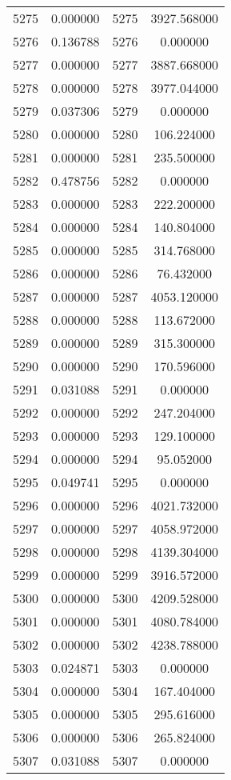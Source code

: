 \documentclass[12pt]{article}
\begin{document}
\begin{longtable}{@{}cccc@{}}
5275 & 0.000000 & 5275 & 3927.568000 \\
5276 & 0.136788 & 5276 & 0.000000 \\
5277 & 0.000000 & 5277 & 3887.668000 \\
5278 & 0.000000 & 5278 & 3977.044000 \\
5279 & 0.037306 & 5279 & 0.000000 \\
5280 & 0.000000 & 5280 & 106.224000 \\
5281 & 0.000000 & 5281 & 235.500000 \\
5282 & 0.478756 & 5282 & 0.000000 \\
5283 & 0.000000 & 5283 & 222.200000 \\
5284 & 0.000000 & 5284 & 140.804000 \\
5285 & 0.000000 & 5285 & 314.768000 \\
5286 & 0.000000 & 5286 & 76.432000 \\
5287 & 0.000000 & 5287 & 4053.120000 \\
5288 & 0.000000 & 5288 & 113.672000 \\
5289 & 0.000000 & 5289 & 315.300000 \\
5290 & 0.000000 & 5290 & 170.596000 \\
5291 & 0.031088 & 5291 & 0.000000 \\
5292 & 0.000000 & 5292 & 247.204000 \\
5293 & 0.000000 & 5293 & 129.100000 \\
5294 & 0.000000 & 5294 & 95.052000 \\
5295 & 0.049741 & 5295 & 0.000000 \\
5296 & 0.000000 & 5296 & 4021.732000 \\
5297 & 0.000000 & 5297 & 4058.972000 \\
5298 & 0.000000 & 5298 & 4139.304000 \\
5299 & 0.000000 & 5299 & 3916.572000 \\
5300 & 0.000000 & 5300 & 4209.528000 \\
5301 & 0.000000 & 5301 & 4080.784000 \\
5302 & 0.000000 & 5302 & 4238.788000 \\
5303 & 0.024871 & 5303 & 0.000000 \\
5304 & 0.000000 & 5304 & 167.404000 \\
5305 & 0.000000 & 5305 & 295.616000 \\
5306 & 0.000000 & 5306 & 265.824000 \\
5307 & 0.031088 & 5307 & 0.000000 \\

\end{longtable}
\end{document}
